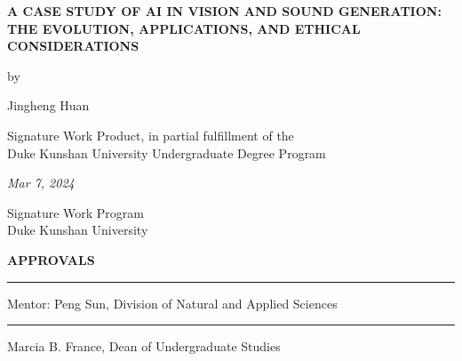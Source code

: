 \documentclass[11pt,a4paper,oneside]{report}
\begin{document}
\onehalfspacing

\newcommand{\authorname}{Jingheng Huan}

\newcommand{\thetitle}{A CASE STUDY OF AI IN VISION AND SOUND GENERATION: THE EVOLUTION, APPLICATIONS, AND ETHICAL CONSIDERATIONS}

\newcommand{\submissiondate}{Mar 7, 2024}

\newcommand{\mentor}{Peng Sun}

\newcommand{\academicunit}{Division of Natural and Applied Sciences}




\begin{titlepage}

\vspace*{\bigskipamount}

\begin{center}
{\sffamily\LARGE\bfseries\MakeUppercase\thetitle\par}

\bigskip

by

\bigskip

{\Large \authorname}

\bigskip

Signature Work Product, in partial fulfillment of the \\
Duke Kunshan University Undergraduate Degree Program

\bigskip

\emph{\submissiondate}

\bigskip

Signature Work Program \\
Duke Kunshan University

\end{center}

\vfill

\textbf{\textsf{APPROVALS}}

\bigskip\bigskip\bigskip
\hrule

Mentor: \mentor, \academicunit

\bigskip\bigskip\bigskip
\hrule

Marcia B. France, Dean of Undergraduate Studies

\end{titlepage}
\end{document}
